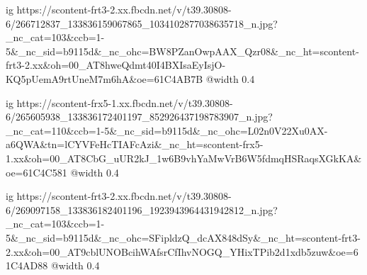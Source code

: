  
 
 
 
 

\ifcmt
  ig https://scontent-frt3-2.xx.fbcdn.net/v/t39.30808-6/266712837_133836159067865_1034102877038635718_n.jpg?_nc_cat=103&ccb=1-5&_nc_sid=b9115d&_nc_ohc=BW8PZanOwpAAX_Qzr08&_nc_ht=scontent-frt3-2.xx&oh=00_AT8hweQdmt40I4BXIsaEyIsjO-KQ5pUemA9rtUneM7m6hA&oe=61C4AB7B
  @width 0.4
\fi

\ifcmt
  ig https://scontent-frx5-1.xx.fbcdn.net/v/t39.30808-6/265605938_133836172401197_852926437198783907_n.jpg?_nc_cat=110&ccb=1-5&_nc_sid=b9115d&_nc_ohc=L02n0V22Xu0AX-a6QWA&tn=lCYVFeHcTIAFcAzi&_nc_ht=scontent-frx5-1.xx&oh=00_AT8CbG_uUR2kJ_1w6B9vhYaMwVrB6W5fdmqHSRaqsXGkKA&oe=61C4C581
  @width 0.4
\fi

\ifcmt
  ig https://scontent-frt3-2.xx.fbcdn.net/v/t39.30808-6/269097158_133836182401196_1923943964431942812_n.jpg?_nc_cat=103&ccb=1-5&_nc_sid=b9115d&_nc_ohc=SFipldzQ_dcAX848dSy&_nc_ht=scontent-frt3-2.xx&oh=00_AT9cblUNOBcihWAfsrCfIhvNOGQ_YHixTPib2d1xdb5zuw&oe=61C4AD88
  @width 0.4
\fi
